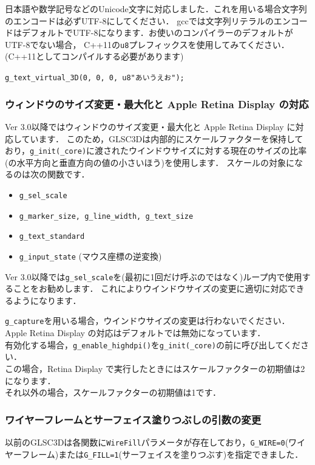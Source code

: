 \documentclass[platex,a4paper,12pt]{jsarticle}%
\begin{document}
日本語や数学記号などのUnicode文字に対応しました．これを用いる場合文字列のエンコードは必ずUTF-8にしてください．
gccでは文字列リテラルのエンコードはデフォルトでUTF-8になります．お使いのコンパイラーのデフォルトがUTF-8でない場合，
C++11の\verb|u8|プレフィックスを使用してみてください．(C++11としてコンパイルする必要があります)
\begin{center}
\verb|g_text_virtual_3D(0, 0, 0, u8"あいうえお");|
\end{center}

\subsubsection{ウィンドウのサイズ変更・最大化と Apple Retina Display の対応}
Ver 3.0以降ではウィンドウのサイズ変更・最大化と Apple Retina Display に対応しています．
このため，GLSC3Dは内部的にスケールファクターを保持しており，\verb|g_init(_core)|に渡されたウインドウサイズに対する現在のサイズの比率(の水平方向と垂直方向の値の小さいほう)を使用します．
スケールの対象になるのは次の関数です．
\begin{itemize}
	\item \verb|g_sel_scale|
	\item \verb|g_marker_size, g_line_width, g_text_size|
	\item \verb|g_text_standard|
	\item \verb|g_input_state| (マウス座標の逆変換)
\end{itemize}
Ver 3.0以降では\verb|g_sel_scale|を(最初に1回だけ呼ぶのではなく)ループ内で使用することをお勧めします．
これによりウインドウサイズの変更に適切に対応できるようになります．

\verb|g_capture|を用いる場合，ウインドウサイズの変更は行わないでください．\\

Apple Retina Display の対応はデフォルトでは無効になっています．\\
有効化する場合，\verb|g_enable_highdpi()|を\verb|g_init(_core)|の前に呼び出してください．\\
この場合，Retina Display で実行したときにはスケールファクターの初期値は2になります．\\
それ以外の場合，スケールファクターの初期値は1です．

\subsubsection{ワイヤーフレームとサーフェイス塗りつぶしの引数の変更}
以前のGLSC3Dは各関数に\verb|WireFill|パラメータが存在しており，\verb|G_WIRE=0|(ワイヤーフレーム)または\verb|G_FILL=1|(サーフェイスを塗りつぶす)を指定できました．
\end{document}
